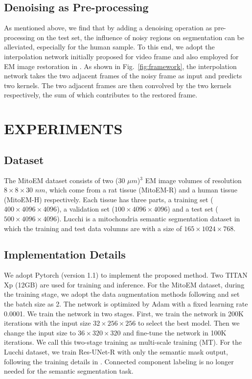 \documentclass{article}
\begin{document}
\subsection{Denoising as Pre-processing}
As mentioned above, we find that by adding a denoising operation as pre-processing on the test set, the influence of noisy regions on segmentation can be alleviated, especially for the human sample.  To this end, we adopt the interpolation network initially proposed for video frame \cite{niklaus2017video} and also employed for EM image restoration in \cite{huang2020learning}. As shown in Fig.~\ref{fig:framework}, the interpolation network takes the two adjacent frames of the noisy frame as input and predicts two kernels. The two adjacent frames are then convolved by the two kernels respectively, the sum of which contributes to the restored frame. 








\section{EXPERIMENTS}
\label{sec:exp}
\subsection{Dataset}
The MitoEM dataset \cite{wei2020mitoem} consists of two (30 $\mu m$)$^3$ EM image volumes of resolution $8 \times 8 \times 30$ $nm$, which come from a rat tissue (MitoEM-R) and a human tissue (MitoEM-H) respectively. 
Each tissue has three parts, a training set ($400 \times 4096 \times 4096$), a validation set ($100 \times 4096 \times 4096$) and a test set ($500 \times 4096 \times 4096$). 
Lucchi \cite{lucchi2011supervoxel} is a mitochondria semantic segmentation dataset in which the training and test data volumns are with a size of $165 \times 1024 \times 768$.
\vspace{-0.7em}







\subsection{Implementation Details}
We adopt Pytorch (version 1.1) to implement the proposed method. Two TITAN Xp (12GB) are used for training and inference. For the MitoEM dataset, during the training stage, we adopt the data augmentation methods following \cite{wei2020mitoem}  and set the batch size as 2. The network is optimized by Adam with a fixed learning rate 0.0001. We train the network in two stages. First, we train the network in 200K iterations with the input size $32\times256\times256$  to select the best model. Then we change the input size to $36\times320\times320$ and fine-tune the network in 100K iterations. We call this two-stage training as multi-scale training (MT). 
For the Lucchi dataset, we train Res-UNet-R with only the semantic mask output, following the training details in \cite{wei2020mitoem}. Connected component labeling is no longer needed for the semantic segmentation task.
\end{document}

